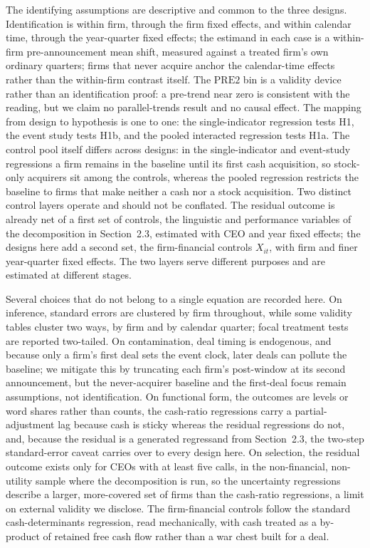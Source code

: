The identifying assumptions are descriptive and common to the three designs. Identification is within firm, through the firm fixed effects, and within calendar time, through the year-quarter fixed effects; the estimand in each case is a within-firm pre-announcement mean shift, measured against a treated firm's own ordinary quarters; firms that never acquire anchor the calendar-time effects rather than the within-firm contrast itself. The $\mathrm{PRE2}$ bin is a validity device rather than an identification proof: a pre-trend near zero is consistent with the reading, but we claim no parallel-trends result and no causal effect. The mapping from design to hypothesis is one to one: the single-indicator regression tests H1, the event study tests H1b, and the pooled interacted regression tests H1a. The control pool itself differs across designs: in the single-indicator and event-study regressions a firm remains in the baseline until its first cash acquisition, so stock-only acquirers sit among the controls, whereas the pooled regression restricts the baseline to firms that make neither a cash nor a stock acquisition. Two distinct control layers operate and should not be conflated. The residual outcome is already net of a first set of controls, the linguistic and performance variables of the decomposition in Section~2.3, estimated with CEO and year fixed effects; the designs here add a second set, the firm-financial controls $X_{it}$, with firm and finer year-quarter fixed effects. The two layers serve different purposes and are estimated at different stages.

Several choices that do not belong to a single equation are recorded here. On inference, standard errors are clustered by firm throughout, while some validity tables cluster two ways, by firm and by calendar quarter; focal treatment tests are reported two-tailed. On contamination, deal timing is endogenous, and because only a firm's first deal sets the event clock, later deals can pollute the baseline; we mitigate this by truncating each firm's post-window at its second announcement, but the never-acquirer baseline and the first-deal focus remain assumptions, not identification. On functional form, the outcomes are levels or word shares rather than counts, the cash-ratio regressions carry a partial-adjustment lag because cash is sticky whereas the residual regressions do not, and, because the residual is a generated regressand from Section~2.3, the two-step standard-error caveat carries over to every design here. On selection, the residual outcome exists only for CEOs with at least five calls, in the non-financial, non-utility sample where the decomposition is run, so the uncertainty regressions describe a larger, more-covered set of firms than the cash-ratio regressions, a limit on external validity we disclose. The firm-financial controls follow the standard cash-determinants regression, read mechanically, with cash treated as a by-product of retained free cash flow rather than a war chest built for a deal.

